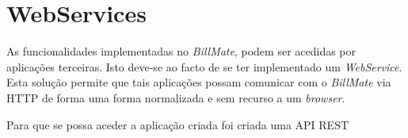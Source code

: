 \section{WebServices}

As funcionalidades implementadas no \emph{BillMate}, podem ser acedidas por aplicações terceiras. Isto deve-se ao facto de se ter implementado um \emph{WebService}. Esta solução permite que tais aplicações possam comunicar com o \emph{BillMate} via HTTP de forma uma forma normalizada e sem recurso a um \emph{browser}.

Para que se possa aceder a aplicação criada foi criada uma API REST









